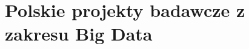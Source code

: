 \section{Polskie projekty badawcze z zakresu Big Data}
\label{sec:polskie_projekty_badawcze_z_zakresu_big_data}


